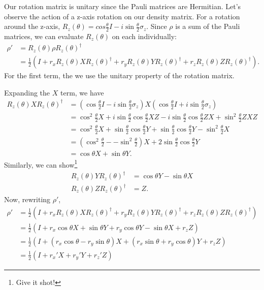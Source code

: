 \documentclass[11pt]{article} %
\begin{document}
Our rotation matrix is unitary since the Pauli matrices are Hermitian. Let's observe the action of a z-axis rotation on our density matrix. For a rotation around the z-axis, $R_z(\theta) = cos\frac{\theta}{2}I-i\sin\frac{\theta}{2}\sigma_z$. Since $\rho$ is a sum of the Pauli matrices, we can evaluate $R_z(\theta)$ on each individually:
\begin{align}
    \rho' &= R_z(\theta)\rho R_z(\theta)^\dagger\\
    &= \frac{1}{2}\left(I+r_x R_z(\theta)X R_z(\theta)^\dagger +r_y R_z(\theta)Y R_z(\theta)^\dagger + r_z R_z(\theta)Z R_z(\theta)^\dagger\right).
\end{align}
For the first term, the we use the unitary property of the rotation matrix.

Expanding the $X$ term, we have
\begin{align}
    R_z(\theta)X R_z(\theta)^\dagger &= \left(\cos\frac{\theta}{2}I-i\sin\frac{\theta}{2}\sigma_z\right)X\left(\cos\frac{\theta}{2}I+i\sin\frac{\theta}{2}\sigma_z\right)\\
    &= \cos^2\frac{\theta}{2}X + i\sin\frac{\theta}{2}\cos\frac{\theta}{2}XZ - i\sin\frac{\theta}{2}\cos\frac{\theta}{2}ZX+\sin^2\frac{\theta}{2}ZXZ\\
    &= \cos^2\frac{\theta}{2}X + \sin\frac{\theta}{2}\cos\frac{\theta}{2}Y + \sin\frac{\theta}{2}\cos\frac{\theta}{2}Y - \sin^2\frac{\theta}{2}X\\
    &= \left(\cos^2\frac{\theta}{2}-- \sin^2\frac{\theta}{2}\right)X + 2\sin\frac{\theta}{2}\cos\frac{\theta}{2}Y\nonumber\\
    &= \cos\theta X + \sin\theta Y.
\end{align}
Similarly, we can show\footnote{Give it shot!}
\begin{align}
    R_z(\theta)Y R_z(\theta)^\dagger &= \cos\theta Y - \sin\theta X\\
    R_z(\theta)Z R_z(\theta)^\dagger &= Z.
\end{align}
Now, rewriting $\rho'$,
\begin{align}
    \rho' &= \frac{1}{2}\left(I+r_x R_z(\theta)X R_z(\theta)^\dagger +r_y R_z(\theta)Y R_z(\theta)^\dagger + r_z R_z(\theta)Z R_z(\theta)^\dagger\right)\nonumber\\
    &= \frac{1}{2}\left(I+r_x \cos\theta X + \sin\theta Y +r_y \cos\theta Y - \sin\theta X + r_z Z\right)\nonumber\\
    &= \frac{1}{2}\left(I+(r_x\cos\theta-r_y\sin\theta)X + (r_x\sin\theta+r_y\cos\theta)Y + r_z Z\right)\\
    &= \frac{1}{2}\left(I+r_x'X + r_y'Y+r_z'Z\right)
\end{align}
\end{document}
